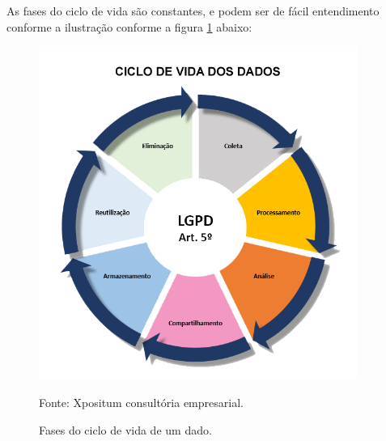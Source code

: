 \documentclass[
	12pt,				%
	openright,			%
	oneside,			%
	a4paper,			%
	english,			%
	french,				%
	spanish,			%
	brazil,				%
	]{abntex2}
\begin{document}
As fases do ciclo de vida são constantes, e podem ser de fácil entendimento conforme a ilustração conforme a figura \ref{fig: 01CicloDeVida} abaixo:

\begin{figure}[ht]
    \centering
    \caption{Fases do ciclo de vida de um dado.}
    \includegraphics[width=4.1in]{Images/01CicloDeVida.png}
    \label{fig: 01CicloDeVida}
    
    \centering \small Fonte: Xpositum consultória empresarial.
\end{figure}
\end{document}
